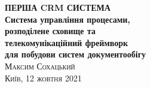\frontmatter
\thispagestyle{empty}
\mbox{}\vspace{1in}
\noindent
\begin{flushright}
\vspace{0.5cm}
\textbf{\Huge ПЕРША CRM СИСТЕМА} \\
\vspace{0.5cm}
\textbf{\huge Система управління процесами, \\
        \huge розподілене сховище та \\
        \huge телекомунікаційний фреймворк \\
        \huge для побудови систем документообігу \\
}
\vspace{1em}
\vspace{6cm}
\hfill{\Large\scshape{}Максим Сохацький}
\\
\vspace{0.3cm}
\hfill{\scshape{}Київ, 12 жовтня 2021}
\end{flushright}
\cleartorecto
\tableofcontents*
\mainmatter
